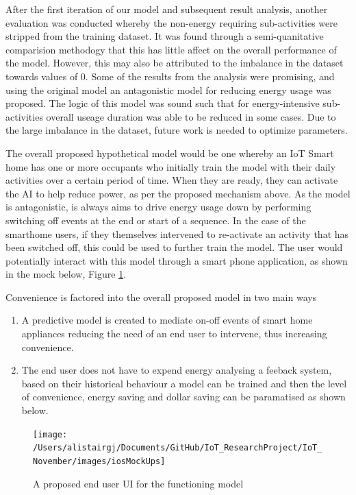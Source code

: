 \documentclass[11pt,]{article}
\providecommand{\tightlist}{%
  \setlength{\itemsep}{0pt}\setlength{\parskip}{0pt}}
\begin{document}
After the first iteration of our model and subsequent result analysis,
another evaluation was conducted whereby the non-energy requiring
sub-activities were stripped from the training dataset. It was found
through a semi-quanitative comparision methodogy that this has little
affect on the overall performance of the model. However, this may also
be attributed to the imbalance in the dataset towards values of 0. Some
of the results from the analysis were promising, and using the original
model an antagonistic model for reducing energy usage was proposed. The
logic of this model was sound such that for energy-intensive
sub-activities overall useage duration was able to be reduced in some
cases. Due to the large imbalance in the dataset, future work is needed
to optimize parameters.

The overall proposed hypothetical model would be one whereby an IoT
Smart home has one or more occupants who initially train the model with
their daily activities over a certain period of time. When they are
ready, they can activate the AI to help reduce power, as per the
proposed mechanism above. As the model is antagonistic, is always aims
to drive energy usage down by performing switching off events at the end
or start of a sequence. In the case of the smarthome users, if they
themselves intervened to re-activate an activity that has been switched
off, this could be used to further train the model. The user would
potentially interact with this model through a smart phone application,
as shown in the mock below, Figure \ref{fig:ios}.

Convenience is factored into the overall proposed model in two main ways

\begin{enumerate}
\def\labelenumi{\arabic{enumi}.}
\tightlist
\item
  A predictive model is created to mediate on-off events of smart home
  appliances reducing the need of an end user to intervene, thus
  increasing convenience.
\item
  The end user does not have to expend energy analysing a feeback
  system, based on their historical behaviour a model can be trained and
  then the level of convenience, energy saving and dollar saving can be
  paramatised as shown below.
\end{enumerate}

\begin{figure}[H]

{\centering \texttt{[image: /Users/alistairgj/Documents/GitHub/IoT\_ResearchProject/IoT\_November/images/iosMockUps]} 

}

\caption{A proposed end user UI for the functioning model}\label{fig:ios}
\end{figure}
\end{document}
